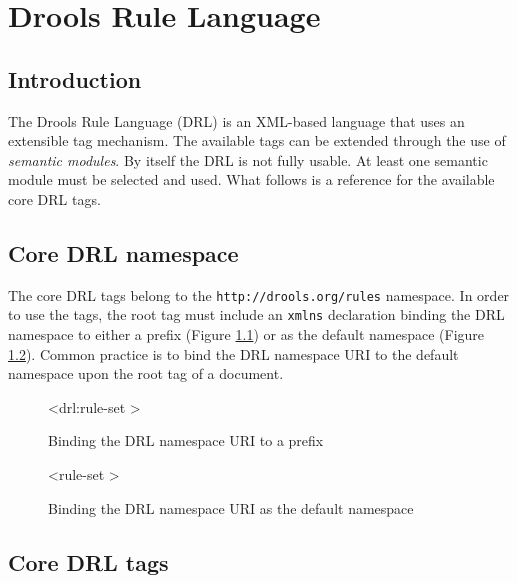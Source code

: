 \chapter{Drools Rule Language}
\label{drl}

\section{Introduction}

The Drools Rule Language (DRL) is an XML-based
language that uses an extensible tag mechanism.  The available tags
can be extended through the use of \emph{semantic modules}.
By itself the DRL is not fully usable.  At least one semantic module
must be selected and used.  What follows is a reference for the
available core DRL tags.

\section{Core DRL namespace}

The core DRL tags belong to the \verb|http://drools.org/rules|
namespace.  In order to use the tags, the root tag must include
an \verb|xmlns| declaration binding the DRL namespace to either
a prefix (Figure \ref{drl.namespace.prefix}) or as the default namespace
(Figure \ref{drl.namespace.default}).  Common practice is to bind the
DRL namespace URI to the default namespace upon the root
 tag of a document.

\begin{figure}[hb]
\begin{tagExample}
<drl:rule-set \color{black}{xmlns:drl="http://drools.org/rules"}>
\end{tagExample}
\caption{Binding the DRL namespace URI to a prefix}
\label{drl.namespace.prefix}
\end{figure}

\begin{figure}[hb]
\begin{tagExample}
<rule-set \color{black}{xmlns="http://drools.org/rules"}>
\end{tagExample}
\caption{Binding the DRL namespace URI as the default namespace}
\label{drl.namespace.default}
\end{figure}

\section{Core DRL tags}

